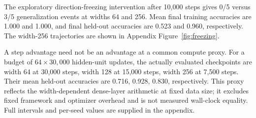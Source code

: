 The exploratory direction-freezing intervention after 10,000 steps gives 0/5 versus 3/5 generalization events at widths 64 and 256. Mean final training accuracies are 1.000 and 1.000, and final held-out accuracies are 0.523 and 0.960, respectively. The width-256 trajectories are shown in Appendix Figure~\ref{fig:freezing}.

A step advantage need not be an advantage at a common compute proxy. For a budget of $64\times30{,}000$ hidden-unit updates, the actually evaluated checkpoints are width 64 at 30,000 steps, width 128 at 15,000 steps, width 256 at 7,500 steps. Their mean held-out accuracies are 0.716, 0.928, 0.830, respectively. This proxy reflects the width-dependent dense-layer arithmetic at fixed data size; it excludes fixed framework and optimizer overhead and is not measured wall-clock equality. Full intervals and per-seed values are supplied in the appendix.
